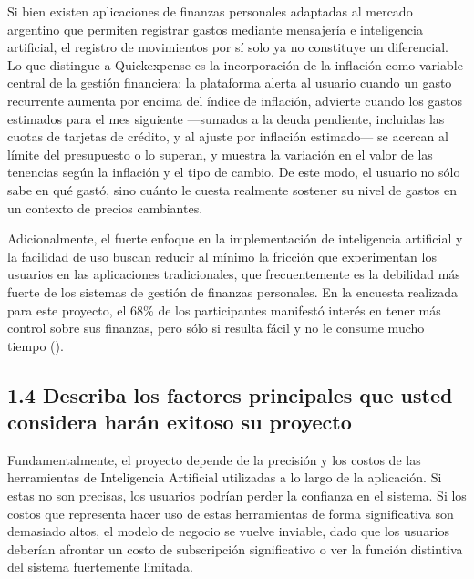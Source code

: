 Si bien existen aplicaciones de finanzas personales adaptadas al mercado
argentino que permiten registrar gastos mediante mensajería e
inteligencia artificial, el registro de movimientos por sí solo ya no
constituye un diferencial. Lo que distingue a Quickexpense es la
incorporación de la inflación como variable central de la gestión
financiera: la plataforma alerta al usuario cuando un gasto recurrente
aumenta por encima del índice de inflación, advierte cuando los gastos
estimados para el mes siguiente ---sumados a la deuda pendiente,
incluidas las cuotas de tarjetas de crédito, y al ajuste por inflación
estimado--- se acercan al límite del presupuesto o lo superan, y muestra
la variación en el valor de las tenencias según la inflación y el tipo
de cambio. De este modo, el usuario no sólo sabe en qué gastó, sino
cuánto le cuesta realmente sostener su nivel de gastos en un contexto de
precios cambiantes.

Adicionalmente, el fuerte enfoque en la implementación de inteligencia
artificial y la facilidad de uso buscan reducir al mínimo la fricción
que experimentan los usuarios en las aplicaciones tradicionales, que
frecuentemente es la debilidad más fuerte de los sistemas de gestión de
finanzas personales. En la encuesta realizada para este proyecto, el
68\% de los participantes manifestó interés en tener más control sobre
sus finanzas, pero sólo si resulta fácil y no le consume mucho tiempo
().

\subsection*{1.4 Describa los factores principales que usted considera
harán exitoso su
proyecto}\label{describa-los-factores-principales-que-usted-considera-haruxe1n-exitoso-su-proyecto}

Fundamentalmente, el proyecto depende de la precisión y los costos de
las herramientas de Inteligencia Artificial utilizadas a lo largo de la
aplicación. Si estas no son precisas, los usuarios podrían perder la
confianza en el sistema. Si los costos que representa hacer uso de estas
herramientas de forma significativa son demasiado altos, el modelo de
negocio se vuelve inviable, dado que los usuarios deberían afrontar un
costo de subscripción significativo o ver la función distintiva del
sistema fuertemente limitada.


